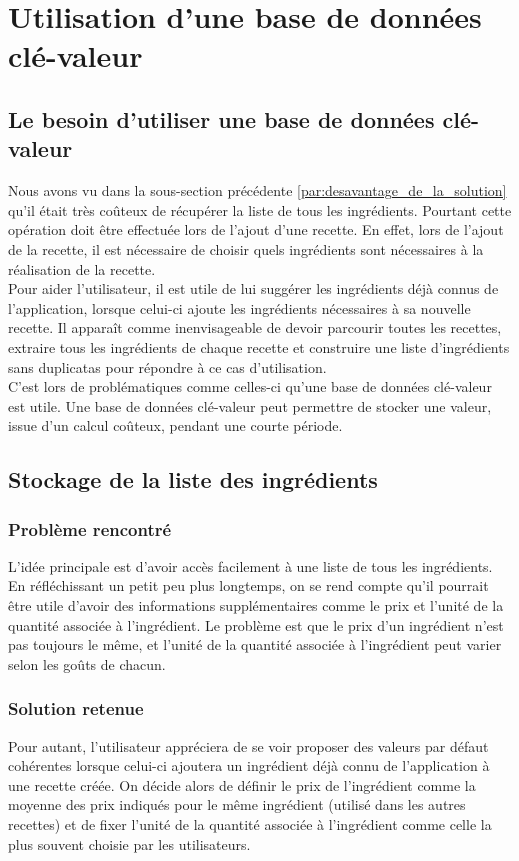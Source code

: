\section{Utilisation d'une base de données clé-valeur}
	\subsection{Le besoin d'utiliser une base de données clé-valeur }
		Nous avons vu dans la sous-section précédente \ref{par:desavantage_de_la_solution} qu'il était très coûteux de récupérer la liste de tous les ingrédients. Pourtant cette opération doit être effectuée lors de l'ajout d'une recette. En effet, lors de l'ajout de la recette, il est nécessaire de choisir quels ingrédients sont nécessaires à la réalisation de la recette.\\

		Pour aider l'utilisateur, il est utile de lui suggérer les ingrédients déjà connus de l'application, lorsque celui-ci ajoute les ingrédients nécessaires à sa nouvelle recette. Il apparaît comme inenvisageable de devoir parcourir toutes les recettes, extraire tous les ingrédients de chaque recette et construire une liste d'ingrédients sans duplicatas pour répondre à ce cas d'utilisation.\\

		C'est lors de problématiques comme celles-ci qu'une base de données clé-valeur est utile. Une base de données clé-valeur peut permettre de stocker une valeur, issue d'un calcul coûteux, pendant une courte période.

	\subsection{Stockage de la liste des ingrédients}
		\subsubsection{Problème rencontré}
			L'idée principale est d'avoir accès facilement à une liste de tous les ingrédients. En réfléchissant un petit peu plus longtemps, on se rend compte qu'il pourrait être utile d'avoir des informations supplémentaires comme le prix et l'unité de la quantité associée à l'ingrédient. Le problème est que le prix d'un ingrédient n'est pas toujours le même, et l'unité de la quantité associée à l'ingrédient peut varier selon les goûts de chacun.\\

		\subsubsection{Solution retenue}
			Pour autant, l'utilisateur appréciera de se voir proposer des valeurs par défaut cohérentes lorsque celui-ci ajoutera un ingrédient déjà connu de l'application à une recette créée. On décide alors de définir le prix de l'ingrédient comme la moyenne des prix indiqués pour le même ingrédient (utilisé dans les autres recettes) et de fixer l'unité de la quantité associée à l'ingrédient comme celle la plus souvent choisie par les utilisateurs.\\


